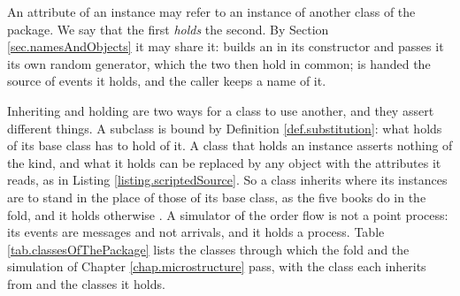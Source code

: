 An attribute of an instance may refer to an instance of another class of the package.
We say that the first \emph{holds} the second.
By Section \ref{sec.namesAndObjects} it may share it:
 builds an  in its constructor
and passes it its own random generator, which the two then hold in common;
 is handed the source of events it holds,
and the caller keeps a name of it.

Inheriting and holding are two ways for a class to use another,
and they assert different things.
A subclass is bound by Definition \ref{def.substitution}:
what holds of its base class has to hold of it.
A class that holds an instance asserts nothing of the kind,
and what it holds can be replaced by any object with the attributes it reads,
as in Listing \ref{listing.scriptedSource}.
So a class inherits where its instances are to stand in the place of those of its base class,
as the five books do in the fold, and it holds otherwise \citep[Chapter 1]{GHJV94des}.
A simulator of the order flow is not a point process:
its events are messages and not arrivals,
and it holds a process.
Table \ref{tab.classesOfThePackage} lists the classes
through which the fold and the simulation of Chapter \ref{chap.microstructure} pass,
with the class each inherits from and the classes it holds.


